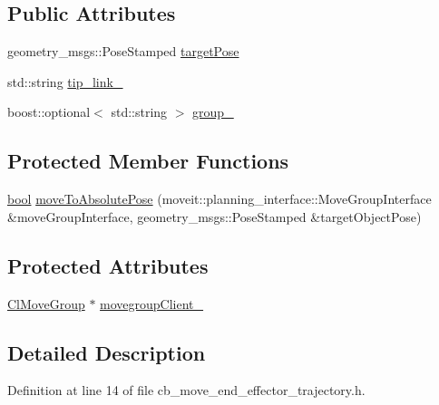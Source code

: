 \subsection*{Public Attributes}
\begin{DoxyCompactItemize}
\item 
geometry\+\_\+msgs\+::\+Pose\+Stamped \hyperlink{classmove__group__interface__client_1_1CbMoveEndEffectorTrajectory_aa198e85db3b6a4c7be54d9a7adab6b93}{target\+Pose}
\item 
std\+::string \hyperlink{classmove__group__interface__client_1_1CbMoveEndEffectorTrajectory_a878c577a789edd0e89b998ea507f4435}{tip\+\_\+link\+\_\+}
\item 
boost\+::optional$<$ std\+::string $>$ \hyperlink{classmove__group__interface__client_1_1CbMoveEndEffectorTrajectory_a38bb04b73316bb8c1db3918c73ec1225}{group\+\_\+}
\end{DoxyCompactItemize}
\subsection*{Protected Member Functions}
\begin{DoxyCompactItemize}
\item 
\hyperlink{classbool}{bool} \hyperlink{classmove__group__interface__client_1_1CbMoveEndEffectorTrajectory_a51655226081ce9a7e9095a92b1a635d9}{move\+To\+Absolute\+Pose} (moveit\+::planning\+\_\+interface\+::\+Move\+Group\+Interface \&move\+Group\+Interface, geometry\+\_\+msgs\+::\+Pose\+Stamped \&target\+Object\+Pose)
\end{DoxyCompactItemize}
\subsection*{Protected Attributes}
\begin{DoxyCompactItemize}
\item 
\hyperlink{classmove__group__interface__client_1_1ClMoveGroup}{Cl\+Move\+Group} $\ast$ \hyperlink{classmove__group__interface__client_1_1CbMoveEndEffectorTrajectory_a064737a9472ba96622016e2bda983193}{movegroup\+Client\+\_\+}
\end{DoxyCompactItemize}


\subsection{Detailed Description}


Definition at line 14 of file cb\+\_\+move\+\_\+end\+\_\+effector\+\_\+trajectory.\+h.



